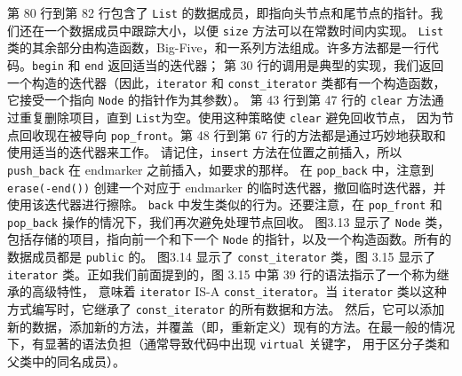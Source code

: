 \documentclass[a4paper]{ctexart}
\theoremstyle{definition}
\theoremstyle{definition}
\begin{document}
第 80 行到第 82 行包含了 \verb|List| 的数据成员，即指向头节点和尾节点的指针。我们还在一个数据成员中跟踪大小，以便 \verb|size| 方法可以在常数时间内实现。
\verb|List| 类的其余部分由构造函数，Big-Five，和一系列方法组成。许多方法都是一行代码。\verb|begin| 和 \verb|end| 返回适当的迭代器；
第 30 行的调用是典型的实现，我们返回一个构造的迭代器（因此，\verb|iterator| 和 \verb|const_iterator| 类都有一个构造函数，
它接受一个指向 \verb|Node| 的指针作为其参数）。
第 43 行到第 47 行的 \verb|clear| 方法通过重复删除项目，直到 \verb|List|为空。使用这种策略使 \verb|clear| 避免回收节点，
因为节点回收现在被导向 \verb|pop_front|。第 48 行到第 67 行的方法都是通过巧妙地获取和使用适当的迭代器来工作。
请记住，\verb|insert| 方法在位置之前插入，所以 \verb|push_back| 在 endmarker 之前插入，如要求的那样。
在 \verb|pop_back| 中，注意到 \verb|erase(-end())| 创建一个对应于 endmarker 的临时迭代器，撤回临时迭代器，并使用该迭代器进行擦除。
\verb|back| 中发生类似的行为。还要注意，在 \verb|pop_front| 和 \verb|pop_back| 操作的情况下，我们再次避免处理节点回收。
图3.13 显示了 \verb|Node| 类，包括存储的项目，指向前一个和下一个 \verb|Node| 的指针，以及一个构造函数。所有的数据成员都是 \verb|public| 的。
图3.14 显示了 \verb|const_iterator| 类，图 3.15 显示了 \verb|iterator| 类。正如我们前面提到的，图 3.15 中第 39 行的语法指示了一个称为继承的高级特性，
意味着 \verb|iterator| IS-A \verb|const_iterator|。当 \verb|iterator| 类以这种方式编写时，它继承了 \verb|const_iterator| 的所有数据和方法。
然后，它可以添加新的数据，添加新的方法，并覆盖（即，重新定义）现有的方法。在最一般的情况下，有显著的语法负担（通常导致代码中出现 \verb|virtual| 关键字，
用于区分子类和父类中的同名成员）。






\end{document}
